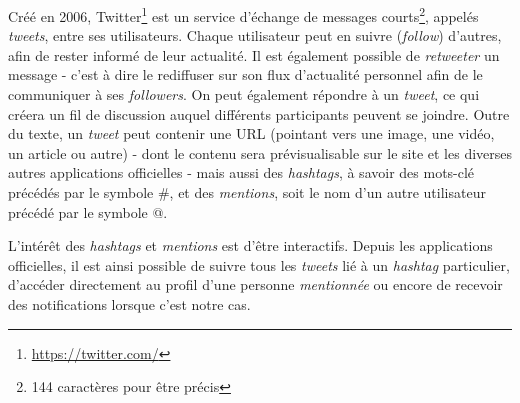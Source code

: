         Créé en 2006, Twitter\footnote{\url{https://twitter.com/}} est un service d'échange de messages courts\footnote{144 caractères pour être précis}, appelés \emph{tweets}, entre ses utilisateurs.
        Chaque utilisateur peut en suivre (\emph{follow}) d'autres, afin de rester informé de leur actualité.
        Il est également possible de \emph{retweeter} un message - c'est à dire le rediffuser sur son flux d'actualité personnel afin de le communiquer à ses \emph{followers}.
        On peut également répondre à un \emph{tweet}, ce qui créera un fil de discussion auquel différents participants peuvent se joindre.
        Outre du texte, un \emph{tweet} peut contenir une URL (pointant vers une image, une vidéo, un article ou autre) - dont le contenu sera prévisualisable sur le site et les diverses autres applications officielles - mais aussi des \emph{hashtags}, à savoir des mots-clé précédés par le symbole \#, et des \emph{mentions}, soit le nom d'un autre utilisateur précédé par le symbole @.
        
        L'intérêt des \emph{hashtags} et \emph{mentions} est d'être interactifs. Depuis les applications officielles, il est ainsi possible de suivre tous les \emph{tweets} lié à un \emph{hashtag} particulier, d'accéder directement au profil d'une personne \emph{mentionnée} ou encore de recevoir des notifications lorsque c'est notre cas.
    
